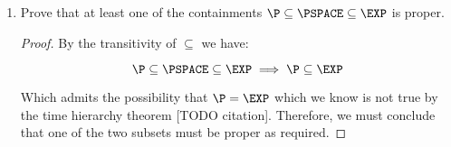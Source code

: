 \documentclass[usletter]{article}
\begin{document}
\begin{enumerate}
\begin{proof}
        \begin{enumerate}
          \item Simulate $M_{const}(\lfloor M_{const} \rfloor)$ and record the running time.
          \item If $M_{const}(\lfloor M_{const} \rfloor) = 1$ then we know that $M_{const}$ is a constant time algorithm and we simulate its execution with the input $x$.
          \item If $M_{const}(x) = 1$, write $|x|^2$ ones to a work tape and exit, otherwise exit having used a constant amount of time (by b) to run $M_{const}$ twice..
          \item Otherwise if $M_{const}(\lfloor M_{const} \rfloor) = 0$ then we know that $M_{const}$ is not a constant time algorithm, but since $M_{const}$ is a deterministic Turing machine this simulated execution has a fixed execution time $T_{const}(n)$. We simulate its execution with the input $x$ and record the running time.
          \item If $M_{const}(x) = 1$ exit having run the non-constant time $M_{const}$ twice. Otherwise write ${3 \cdot T_{const}(n)}$ ones to a work tape which is both constant and by definition must exceed the execution time of $M_{const}(\lfloor M_{const} \rfloor)$.
        \end{enumerate}

        By assumption $M_{const}(\lfloor M_{\beta} \rfloor) = 1$ if $M_{\beta}$ is a constant time algorithm and $0$ if it isn't.

        Note $M_{\beta}$ halts for all inputs.
      \end{proof}

    \item Prove that at least one of the containments $\P \subseteq \PSPACE \subseteq \EXP$ is proper.

      \begin{proof}
        By the transitivity of $\subseteq$ we have:

        \begin{equation}
          \P \subseteq \PSPACE \subseteq \EXP \implies \P \subseteq \EXP
        \end{equation}

        Which admits the possibility that $\P = \EXP$ which we know is not true by the time hierarchy theorem [TODO citation]. Therefore, we must conclude that one of the two subsets must be proper as required.
      \end{proof}



\end{enumerate}
\end{document}
